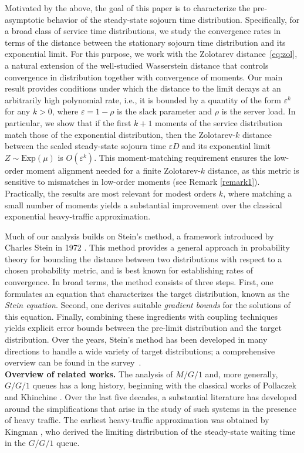 \documentclass[11pt,letterpaper,reqno]{article}
\theoremstyle{thmstyleone}%
\theoremstyle{thmstyletwo}%
\theoremstyle{thmstylethree}%
\numberwithin{equation}{section}
\begin{document}
Motivated by the above, the goal of this paper is to characterize the pre-asymptotic behavior of the steady-state sojourn time distribution. Specifically, for a broad class of service time distributions, we study the convergence rates in terms of the distance between the stationary sojourn time distribution and its exponential limit. For this purpose, we work with the Zolotarev distance~\eqref{eq:zol}, a natural extension of the well-studied Wasserstein distance that controls convergence in distribution together with convergence of moments. 
Our main result provides conditions under which the distance to the limit decays at an arbitrarily high polynomial rate, i.e., it is bounded by a quantity of the form $\varepsilon^k$ for any $k >0$, where $\varepsilon=1-\rho$ is the slack parameter and $\rho$ is the server load.  
In particular, we show that if the first $k+1$ moments of the service distribution match those of the exponential distribution, then the Zolotarev-$k$ distance between the scaled steady-state sojourn time $\varepsilon D$ and its exponential limit $Z\sim \mathrm{Exp}(\mu)$ is $O(\varepsilon^k)$. This moment-matching requirement ensures the low-order moment alignment needed for a finite Zolotarev-$k$ distance, as this metric is sensitive to mismatches in low-order moments (see Remark \ref{remark1}). Practically, the results are most relevant for modest orders 
$k$, where matching a small number of moments yields a substantial improvement over the classical exponential heavy-traffic approximation.

Much of our analysis builds on Stein’s method, a framework introduced by Charles Stein in 1972 \cite{cs}. This method provides a general approach in probability theory for bounding the distance between two distributions with respect to a chosen probability metric, and is best known for establishing rates of convergence. In broad terms, the method consists of three steps. First, one formulates an equation that characterizes the target distribution, known as the \textit{Stein equation}. Second, one derives suitable \textit{gradient bounds} for the solutions of this equation. Finally, combining these ingredients with coupling techniques yields explicit error bounds between the pre-limit distribution and the target distribution. Over the years, Stein’s method has been developed in many directions to handle a wide variety of target distributions; a comprehensive overview can be found in the survey~\cite{NR}. \\

\noindent
\textbf{Overview of related works.} 
The analysis of $M/G/1$ and, more generally, $G/G/1$ queues has a long history, beginning with the classical works of Pollaczek \cite{Pollaczek30} and Khinchine \cite{Khinchin32}. Over the last five decades, a substantial literature has developed around the simplifications that arise in the study of such systems in the presence of heavy traffic. The earliest heavy-traffic approximation was obtained by Kingman \cite{king}, who derived the limiting distribution of the steady-state waiting time in the $G/G/1$ queue.
\end{document}
